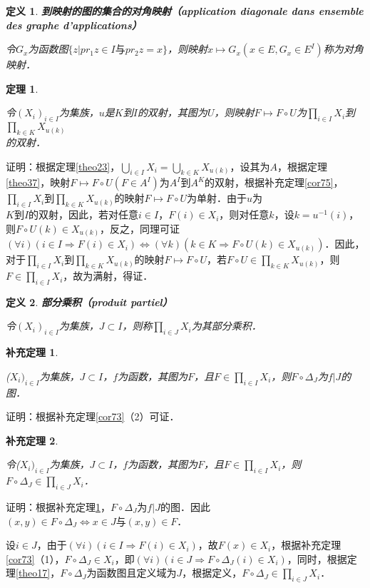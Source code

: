 \documentclass[12pt, a4paper, oneside]{book}
\newtheorem{theo}{定理}
\newtheorem{cor}{补充定理}
\newtheorem{de}{定义}
\begin{document}
			\begin{de}
				\textbf{到映射的图的集合的对角映射（application diagonale dans ensemble des graphe d'applications）}
				\par
				令$G_x$为函数图$\{z|pr_1z\in I\text{与}pr_2z=x\}$，则映射$x\mapsto G_x(x\in E, G_x\in E^I)$称为对角映射．
			\end{de}
						
			\begin{theo}\label{theo40}
				\hfill\par
				令$(X_i)_{i\in I}$为集族，$u$是$K$到$I$的双射，其图为$U$，则映射$F\mapsto F\circ U$为$\prod\limits_{i\in I}X_i$到$\prod\limits_{k\in K}X_{u(k)}$\\的双射．
			\end{theo}
			证明：根据定理\ref{theo23}，$\bigcup\limits_{i\in I}X_i=\bigcup\limits_{k\in K}X_{u(k)}$，设其为$A$，根据定理\ref{theo37}，映射$F\mapsto F\circ U(F\in A^I)$为$A^I$到$A^K$的双射，根据补充定理\ref{cor75}，$\prod\limits_{i\in I}X_i$到$\prod\limits_{k\in K}X_{u(k)}$的映射$F\mapsto F\circ U$为单射．由于$u$为\\$K$到$I$的双射，因此，若对任意$i\in I$，$F(i)\in X_i$，则对任意$k$，设$k=u^{-1}(i)$，则$F\circ U(k)\in X_{u(k)}$，反之，同理可证$(\forall i)(i\in I\Rightarrow F(i)\in X_i)\Leftrightarrow (\forall k)(k\in K\Rightarrow F\circ U(k)\in X_{u(k)})$．因此，对于$\prod\limits_{i\in I}X_i$到$\prod\limits_{k\in K}X_{u(k)}$的映射$F\mapsto F\circ U$，若$F\circ U\in \prod\limits_{k\in K}X_{u(k)}$，则$F\in \prod\limits_{i\in I}X_i$，故为满射，得证．

			\begin{de}
				\textbf{部分乘积（produit partiel）}
				\par
				令$(X_i)_{i\in I}$为集族，$J\subset I$，则称$\prod\limits_{i\in J}X_i$为其部分乘积．			
			\end{de}
						
			\begin{cor}\label{cor135}
				\hfill\par
				($X_i)_{i\in I}$为集族，$J\subset I$，$f$为函数，其图为$F$，且$F\in \prod\limits_{i\in I}X_i$，则$F\circ \Delta_J$为$f|J$的图．
			\end{cor}
			证明：根据补充定理\ref{cor73}（2）可证．
				
			\begin{cor}\label{cor136}
				\hfill\par
				令($X_i)_{i\in I}$为集族，$J\subset I$，$f$为函数，其图为$F$，且$F\in \prod\limits_{i\in I}X_i$，则$F\circ \Delta_J\in \prod\limits_{i\in J}X_i$．
			\end{cor}
			证明：根据补充定理\ref{cor135}，$F\circ \Delta_J$为$f|J$的图．因此$(x, y)\in F\circ \Delta_J\Leftrightarrow x\in J\text{与}(x, y)\in F$．
			\par
			设$i\in J$，由于$(\forall i)(i\in I\Rightarrow F(i)\in X_i)$，故$F(x)\in X_i$，根据补充定理\ref{cor73}（1），$F\circ \Delta_J\in X_i$，即$(\forall i)(i\in J\Rightarrow F\circ \Delta_J (i)\in X_i)$，同时，根据定理\ref{theo17}，$F\circ \Delta_J$为函数图且定义域为$J$，根据定义，$F\circ \Delta_J\in \prod\limits_{i\in J}X_i$．
\end{document}
